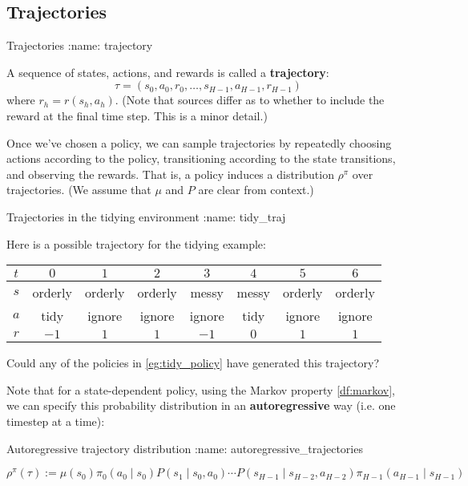 \documentclass[\main/main]{subfiles}
\begin{document}
\subsection{Trajectories}

\begin{definition}{Trajectories}
:name: trajectory

A sequence of states, actions, and rewards is called a \textbf{trajectory}:
\[
    \tau = (s_0, a_0, r_0, \dots, s_{H-1}, a_{H-1}, r_{H-1})
\]
where $r_h = r(s_h, a_h)$. (Note that sources differ as to whether to include the reward at the final time step. This is a minor detail.)
\end{definition}

Once we've chosen a policy, we can sample trajectories by repeatedly choosing actions according to the policy, transitioning according to the state transitions, and observing the rewards. That is, a policy induces a distribution $\rho^{\pi}$ over trajectories. (We assume that $\mu$ and $P$ are clear from context.)

\begin{example}{Trajectories in the tidying environment}
:name: tidy_traj

    Here is a possible trajectory for the tidying example:

    \begin{center}
    \begin{tabular}{cccccccc}
        $t$ & $0$ & $1$ & $2$ & $3$ & $4$ & $5$ & $6$ \\
        \hline
        $s$ & orderly & orderly & orderly & messy & messy & orderly & orderly \\
        $a$ & tidy & ignore & ignore & ignore & tidy & ignore & ignore \\
        $r$ & $-1$ & $1$ & $1$ & $-1$ & $0$ & $1$ & $1$
    \end{tabular}
    \end{center}

    Could any of the policies in \ref{eg:tidy_policy} have generated this trajectory?
\end{example}

Note that for a state-dependent policy, using the Markov property \eqref{df:markov}, we can specify this probability distribution in an \textbf{autoregressive} way (i.e. one timestep at a time):

\begin{definition}{Autoregressive trajectory distribution}
:name: autoregressive_trajectories

    \[
        \rho^{\pi}(\tau) := \mu(s_0) \pi_0(a_0 \mid s_0) P(s_1 \mid s_0, a_0) \cdots P(s_{H-1} \mid s_{H-2}, a_{H-2}) \pi_{H-1}(a_{H-1} \mid s_{H-1})
    \]
\end{definition}
\end{document}
